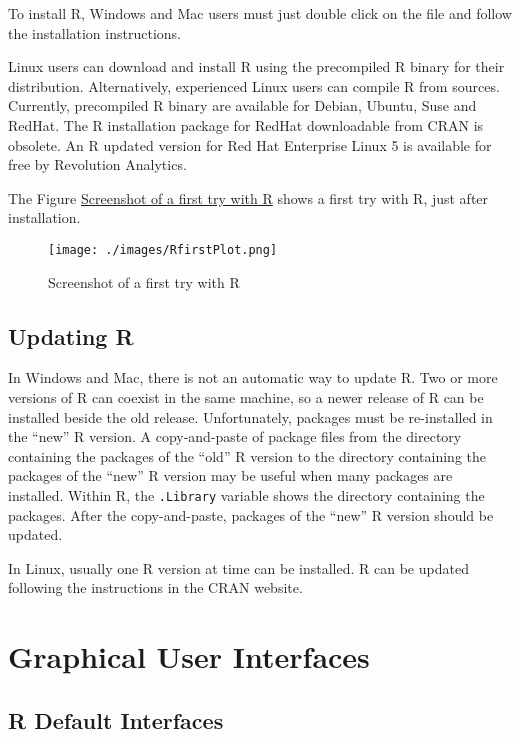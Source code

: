 \documentclass[]{book}
\begin{document}
To install R, Windows and Mac users must just double click on the file
and follow the installation instructions.

Linux users can download and install R using the precompiled R binary
for their distribution. Alternatively, experienced Linux users can
compile R from sources. Currently, precompiled R binary are available
for Debian, Ubuntu, Suse and RedHat. The R installation package for
RedHat downloadable from CRAN is obsolete. An R updated version for Red
Hat Enterprise Linux 5 is available for free by Revolution Analytics.

The Figure \protect\hyperlink{fig:ssFirsttry}{Screenshot of a first try
with R} shows a first try with R, just after installation.

\hypertarget{fig:ssFirsttry}{}
\begin{figure}[htbp]
\centering
\texttt{[image: ./images/RfirstPlot.png]}
\caption{Screenshot of a first try with R\label{fig:ssFirsttry}}
\end{figure}

\clearpage

\subsection{Updating R}\label{updating-r}

In Windows and Mac, there is not an automatic way to update R. Two or
more versions of R can coexist in the same machine, so a newer release
of R can be installed beside the old release. Unfortunately, packages
must be re-installed in the ``new'' R version. A copy-and-paste of
package files from the directory containing the packages of the ``old''
R version to the directory containing the packages of the ``new'' R
version may be useful when many packages are installed. Within R, the
\texttt{.Library} variable shows the directory containing the packages.
After the copy-and-paste, packages of the ``new'' R version should be
updated.

In Linux, usually one R version at time can be installed. R can be
updated following the instructions in the CRAN website.

\section{Graphical User Interfaces}\label{graphical-user-interfaces}

\subsection{R Default Interfaces}\label{r-default-interfaces}
\end{document}
